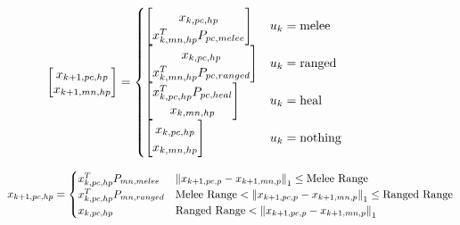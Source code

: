 \documentclass[letterpaper, 10 pt, conference]{ieeeconf}
\begin{document}
\begin{figure}[t]
    \begin{equation} \label{eq:P_pc_a}
        \mqty[x_{k+1,pc,hp}\\ x_{k+1,mn,hp}] = \begin{cases}
            \mqty[x_{k,pc,hp}\\x_{k,mn,hp}^T P_{pc,melee}] & u_k = \text{melee}\\
            \mqty[x_{k,pc,hp}\\x_{k,mn,hp}^T P_{pc,ranged}] & u_k = \text{ranged}\\
            \mqty[x_{k,pc,hp}^T P_{pc,heal}\\ x_{k,mn,hp}] & u_k = \text{heal}\\
            \mqty[x_{k,pc,hp}\\x_{k,mn,hp}] & u_k = \text{nothing}
        \end{cases}
    \end{equation}
    
    \begin{equation} \label{eq:P_mn_a}
        x_{k+1,pc,hp} = \begin{cases}
            x_{k,pc,hp}^T P_{mn,melee}  & \norm{x_{k+1,pc,p} - x_{k+1,mn,p}}_1 \leq \text{Melee Range}\\
            x_{k,pc,hp}^T P_{mn,ranged} & \text{Melee Range} < \norm{x_{k+1,pc,p} - x_{k+1,mn,p}}_1 \leq \text{Ranged Range}\\
            x_{k,pc,hp} & \text{Ranged Range} < \norm{x_{k+1,pc,p} - x_{k+1,mn,p}}_1
        \end{cases}
    \end{equation}
\end{figure}
\end{document}
